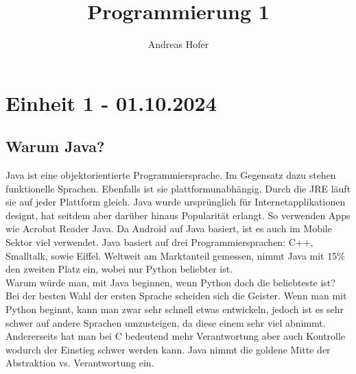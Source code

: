 \documentclass{article}
\title{\vspace{-3cm}Programmierung 1}
\author{Andreas Hofer}
\begin{document}
	\maketitle
	\section{Einheit 1 - 01.10.2024}
	\subsection{Warum Java?}
	\preto{\@verbatim}{\topsep=0pt \partopsep=0pt }
	Java ist eine objektorientierte Programmiersprache. Im Gegensatz dazu stehen funktionelle Sprachen. Ebenfalls ist sie plattformunabhängig. Durch die JRE läuft sie auf jeder Plattform gleich. Java wurde ursprünglich für Internetapplikationen designt, hat seitdem aber darüber hinaus Popularität erlangt. So verwenden Apps wie Acrobat Reader Java. Da Android auf Java basiert, ist es auch im Mobile Sektor viel verwendet. Java basiert auf drei Programmiersprachen: C++, Smalltalk, sowie Eiffel. Weltweit am Marktanteil gemessen, nimmt Java mit 15\% den zweiten Platz ein, wobei nur Python beliebter ist. \\
	Warum würde man, mit Java beginnen, wenn Python doch die beliebteste ist? \\
	Bei der besten Wahl der ersten Sprache scheiden sich die Geister. Wenn man mit Python beginnt, kann man zwar sehr schnell etwas entwickeln, jedoch ist es sehr schwer auf andere Sprachen umzusteigen, da diese einem sehr viel abnimmt. Andererseits hat man bei C bedeutend mehr Verantwortung aber auch Kontrolle wodurch der Einstieg schwer werden kann. Java nimmt die goldene Mitte der Abstraktion vs. Verantwortung ein. \\
\end{document}
